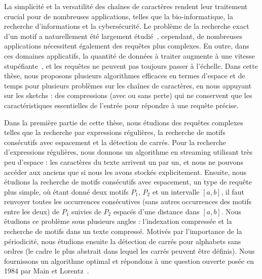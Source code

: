 La simplicité et la versatilité des chaînes de caractères rendent leur traitement crucial pour de nombreuses applications, telles que la bio-informatique, la recherche d'informations et la cybersécurité.
Le problème de la recherche exact d'un motif a naturellement été largement étudié~\cite{Charras2004}, cependant, de nombreuses applications nécessitent également des requêtes plus complexes. En outre, dans ces domaines applicatifs, la quantité de données à traiter augmente à une vitesse stupéfiante~\cite{muir2016real}, et les requêtes ne peuvent pas toujours passer à l'échelle.
Dans cette thèse, nous proposons plusieurs algorithmes efficaces en termes d'espace et de temps pour plusieurs problèmes sur les chaînes de caractères, en nous appuyant sur les sketchs : des compressions (avec ou sans perte) qui ne conservent que les caractéristiques essentielles de l'entrée pour répondre à une requête précise.

Dans la première partie de cette thèse, nous étudions des requêtes complexes telles que la recherche par expressions régulières, la recherche de motifs consécutifs avec espacement et la détection de carrés.
Pour la recherche d'expressions régulières, nous donnons un algorithme en streaming utilisant très peu d'espace : les caractères du texte arrivent un par un, et nous ne pouvons accéder aux anciens que si nous les avons stockés explicitement.
Ensuite, nous étudions la recherche de motifs consécutifs avec espacement, un type de requête plus simple, où étant donné deux motifs $P_1$, $P_2$ et un intervalle $[a, b]$, il faut renvoyer toutes les occurrences consécutives (sans autres occurrences des motifs entre les deux) de $P_1$ suivies  de $P_2$ espacés d'une distance dans $[a, b]$. Nous étudions ce problème sous plusieurs angles : l'indexation compressée et la recherche de motifs dans un texte compressé.
Motivés par l'importance de la périodicité, nous étudions ensuite la détection de carrés pour alphabets sans ordres (le cadre le plus abstrait dans lequel les carrés peuvent être définis). Nous fournissons un algorithme optimal et répondons à une question ouverte posée en 1984 par Main et Lorentz~\cite{Main1984}.

